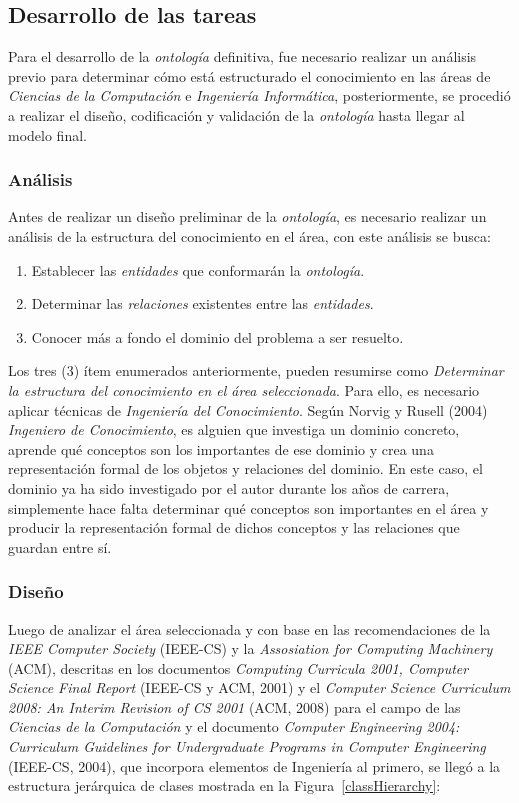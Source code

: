 \begin{itemize}
\subsection{Desarrollo de las tareas}
Para el desarrollo de la \textit{ontología} definitiva, fue necesario realizar un análisis previo para determinar cómo está estructurado el conocimiento en las áreas de \textit{Ciencias de la Computación} e \textit{Ingeniería Informática}, posteriormente, se procedió a realizar el diseño, codificación y validación de la \textit{ontología} hasta llegar al modelo final.

\subsubsection{Análisis}
Antes de realizar un diseño preliminar de la \textit{ontología}, es necesario realizar un análisis de la estructura del conocimiento en el área, con este análisis se busca:

\begin{enumerate}
    \item Establecer las \textit{entidades} que conformarán la \textit{ontología}.
    \item Determinar las \textit{relaciones} existentes entre las \textit{entidades}.
    \item Conocer más a fondo el dominio del problema a ser resuelto.
\end{enumerate}

Los tres (3) ítem enumerados anteriormente, pueden resumirse como \textit{Determinar la estructura del conocimiento en el área seleccionada}. Para ello, es necesario aplicar técnicas de \textit{Ingeniería del Conocimiento}. Según Norvig y Rusell (2004) \textit{Ingeniero de Conocimiento}, es alguien que investiga un dominio concreto, aprende qué conceptos son los importantes de ese dominio y crea una representación formal de los objetos y relaciones del dominio. En este caso, el dominio ya ha sido investigado por el autor durante los años de carrera, simplemente hace falta determinar qué conceptos son importantes en el área y producir la representación formal de dichos conceptos y las relaciones que guardan entre sí.

\subsubsection{Diseño}
Luego de analizar el área seleccionada y con base en las recomendaciones de la \textit{IEEE Computer Society} (IEEE-CS) y la \textit{Assosiation for Computing Machinery} (ACM), descritas en los documentos \textit{Computing Curricula 2001, Computer Science Final Report} (IEEE-CS y ACM, 2001) y el \textit{Computer Science Curriculum 2008: An Interim Revision of CS 2001} (ACM, 2008) para el campo de las \textit{Ciencias de la Computación} y el documento \textit{Computer Engineering 2004: Curriculum Guidelines for Undergraduate Programs in Computer Engineering} (IEEE-CS, 2004), que incorpora elementos de Ingeniería al primero, se llegó a la estructura jerárquica de clases mostrada en la Figura~\ref{classHierarchy}:



\end{itemize}
